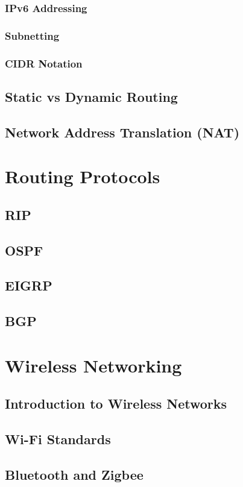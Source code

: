 \documentclass{book}
\begin{document}
        \subsection{IPv6 Addressing}
        \subsection{Subnetting}
        \subsection{CIDR Notation}
    \section{Static vs Dynamic Routing}
    \section{Network Address Translation (NAT)}

\chapter{Routing Protocols}
    \section{RIP}
    \section{OSPF}
    \section{EIGRP}
    \section{BGP}
    
\chapter{Wireless Networking}
    \section{Introduction to Wireless Networks}
    \section{Wi-Fi Standards}
    \section{Bluetooth and Zigbee}
\end{document}
